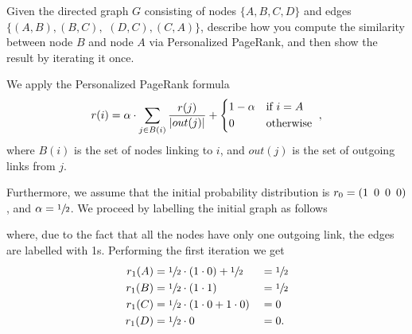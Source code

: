 \exercise

Given the directed graph $G$ consisting of nodes $\{A, B, C, D\}$ and edges 
$\{(A,B), (B,C),$ $ (D,C), (C,A)\}$, describe how you compute the similarity
between node $B$ and node $A$ via Personalized PageRank, and then show the
result by iterating it once.

\solution

We apply the Personalized PageRank formula
%
\begin{equation*}
  r(i) = \alpha\cdot\sum_{j\in B(i)} \frac{r(j)}{|out(j)|} +
  \begin{cases*}
    1-\alpha & if $i=A$ \\
    0        & otherwise
  \end{cases*},
\end{equation*}
where $B(i)$ is the set of nodes linking to $i$, and $out(j)$ is the set of
outgoing links from $j$.

Furthermore, we assume that the initial probability distribution is
$r_0=(1 \enskip 0 \enskip 0 \enskip 0)$, and $\alpha=\sfrac{1}{2}$. We proceed
by labelling the initial graph as follows
%
\begin{center}
\end{center}
%
where, due to the fact that all the nodes have only one outgoing link, the edges
are labelled with 1s. Performing the first iteration we get
%
\begin{alignat*}{3}
  r_1(A) &= \sfrac{1}{2} \cdot (1\cdot0) + \sfrac{1}{2} &&= \sfrac{1}{2} \\
  r_1(B) &= \sfrac{1}{2} \cdot (1\cdot1)                &&= \sfrac{1}{2} \\
  r_1(C) &= \sfrac{1}{2} \cdot (1\cdot0+1\cdot0)        && = 0 \\
  r_1(D) &= \sfrac{1}{2} \cdot 0                        &&= 0.
\end{alignat*}

